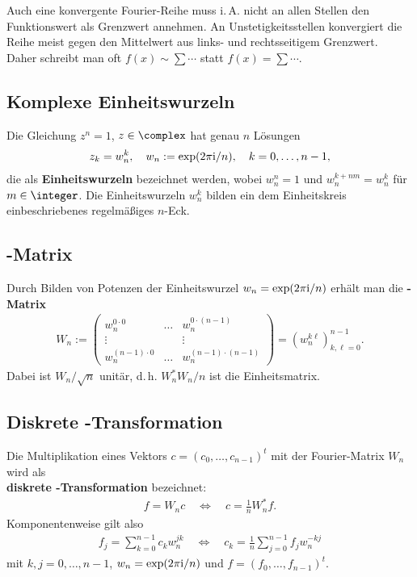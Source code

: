 \linie

Auch eine konvergente Fourier-Reihe muss i.\,A. nicht an allen Stellen den
Funktionswert als Grenzwert annehmen.
An Unstetigkeitsstellen konvergiert die Reihe meist gegen den Mittelwert
aus links- und rechtsseitigem Grenzwert. \\
Daher schreibt man oft $f(x) \sim \sum \dotsb$ statt
$f(x) = \sum \dotsb$.

\subsection{%
    Komplexe Einheitswurzeln%
}

Die Gleichung $z^n = 1$, $z \in \complex$ hat genau $n$ Lösungen
\begin{align*}
    z_k = w_n^k, \quad
    w_n := \exp(2 \pi \mathrm{i} / n), \quad
    k = 0, \dotsc, n - 1,
\end{align*}
die als \textbf{Einheitswurzeln} bezeichnet werden, wobei $w_n^n = 1$ und
$w_n^{k + nm} = w_n^k$ für $m \in \integer$.
Die Einheitswurzeln $w_n^k$ bilden ein dem Einheitskreis einbeschriebenes
regelmäßiges $n$-Eck.

\subsection{%
    -Matrix%
}

Durch Bilden von Potenzen der Einheitswurzel $w_n = \exp(2 \pi \mathrm{i} / n)$
erhält man die \textbf{-Matrix}
\begin{align*}
    W_n :=
    \begin{pmatrix}
        w_n^{0 \cdot 0} & \dots & w_n^{0 \cdot (n - 1)} \\
        \vdots & & \vdots \\
        w_n^{(n - 1) \cdot 0} & \dots & w_n^{(n - 1) \cdot (n - 1)}
    \end{pmatrix} =
    (w_n^{k\ell})_{k,\ell=0}^{n-1}.
\end{align*}
Dabei ist $W_n/\sqrt{n}$ unitär, d.\,h. $W_n^\ast W_n/n$ ist die
Einheitsmatrix.

\subsection{%
    Diskrete -Transformation%
}

Die Multiplikation eines Vektors $c = (c_0, \dotsc, c_{n-1})^t$ mit der
Fourier-Matrix $W_n$ wird als \\
\textbf{diskrete -Transformation}
bezeichnet:
\begin{align*}
    f = W_n c \quad\Leftrightarrow\quad
    c = \frac{1}{n} W_n^\ast f.
\end{align*}
Komponentenweise gilt also
\begin{align*}
    f_j = \sum_{k=0}^{n-1} c_k w_n^{jk} \quad\Leftrightarrow\quad
    c_k = \frac{1}{n} \sum_{j=0}^{n-1} f_j w_n^{-kj}
\end{align*}
mit $k, j = 0, \dotsc, n - 1$, $w_n = \exp(2 \pi \mathrm{i} / n)$ und
$f = (f_0, \dotsc, f_{n-1})^t$.

